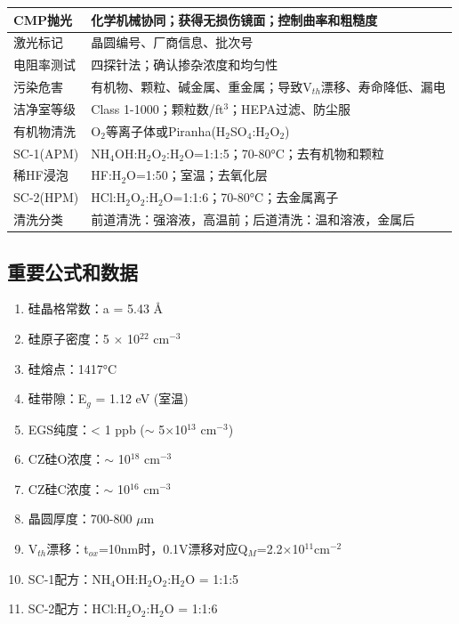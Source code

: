 \documentclass[UTF8,12pt,a4paper]{ctexart}
\begin{document}
\begin{longtable}{|L{4cm}|L{11cm}|}
CMP抛光 & 化学机械协同；获得无损伤镜面；控制曲率和粗糙度 \\
\hline

激光标记 & 晶圆编号、厂商信息、批次号 \\
\hline

电阻率测试 & 四探针法；确认掺杂浓度和均匀性 \\
\hline

污染危害 & 有机物、颗粒、碱金属、重金属；导致V$_{th}$漂移、寿命降低、漏电 \\
\hline

洁净室等级 & Class 1-1000；颗粒数/ft$^3$；HEPA过滤、防尘服 \\
\hline

有机物清洗 & O$_2$等离子体或Piranha(H$_2$SO$_4$:H$_2$O$_2$) \\
\hline

SC-1(APM) & NH$_4$OH:H$_2$O$_2$:H$_2$O=1:1:5；70-80°C；去有机物和颗粒 \\
\hline

稀HF浸泡 & HF:H$_2$O=1:50；室温；去氧化层 \\
\hline

SC-2(HPM) & HCl:H$_2$O$_2$:H$_2$O=1:1:6；70-80°C；去金属离子 \\
\hline

清洗分类 & 前道清洗：强溶液，高温前；后道清洗：温和溶液，金属后 \\
\hline

\end{longtable}

\subsection{重要公式和数据}

\begin{enumerate}
    \item 硅晶格常数：a = 5.43 \AA
    \item 硅原子密度：5 $\times$ 10$^{22}$ cm$^{-3}$
    \item 硅熔点：1417°C
    \item 硅带隙：E$_g$ = 1.12 eV (室温)
    \item EGS纯度：< 1 ppb ($\sim$ 5$\times$10$^{13}$ cm$^{-3}$)
    \item CZ硅O浓度：$\sim$ 10$^{18}$ cm$^{-3}$
    \item CZ硅C浓度：$\sim$ 10$^{16}$ cm$^{-3}$
    \item 晶圆厚度：700-800 $\mu$m
    \item V$_{th}$漂移：t$_{ox}$=10nm时，0.1V漂移对应Q$_M$=2.2$\times$10$^{11}$cm$^{-2}$
    \item SC-1配方：NH$_4$OH:H$_2$O$_2$:H$_2$O = 1:1:5
    \item SC-2配方：HCl:H$_2$O$_2$:H$_2$O = 1:1:6
\end{enumerate}
\end{document}
